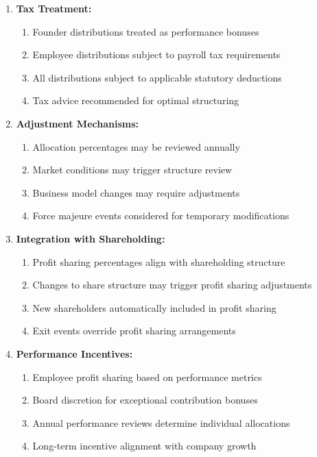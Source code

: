 \begin{enumerate}[label=\arabic*.]
\item \textbf{Tax Treatment:}
    \begin{enumerate}[label=(\alph*)]
    \item Founder distributions treated as performance bonuses
    \item Employee distributions subject to payroll tax requirements
    \item All distributions subject to applicable statutory deductions
    \item Tax advice recommended for optimal structuring
    \end{enumerate}

\item \textbf{Adjustment Mechanisms:}
    \begin{enumerate}[label=(\alph*)]
    \item Allocation percentages may be reviewed annually
    \item Market conditions may trigger structure review
    \item Business model changes may require adjustments
    \item Force majeure events considered for temporary modifications
    \end{enumerate}

\item \textbf{Integration with Shareholding:}
    \begin{enumerate}[label=(\alph*)]
    \item Profit sharing percentages align with shareholding structure
    \item Changes to share structure may trigger profit sharing adjustments
    \item New shareholders automatically included in profit sharing
    \item Exit events override profit sharing arrangements
    \end{enumerate}

\item \textbf{Performance Incentives:}
    \begin{enumerate}[label=(\alph*)]
    \item Employee profit sharing based on performance metrics
    \item Board discretion for exceptional contribution bonuses
    \item Annual performance reviews determine individual allocations
    \item Long-term incentive alignment with company growth
    \end{enumerate}
\end{enumerate}

